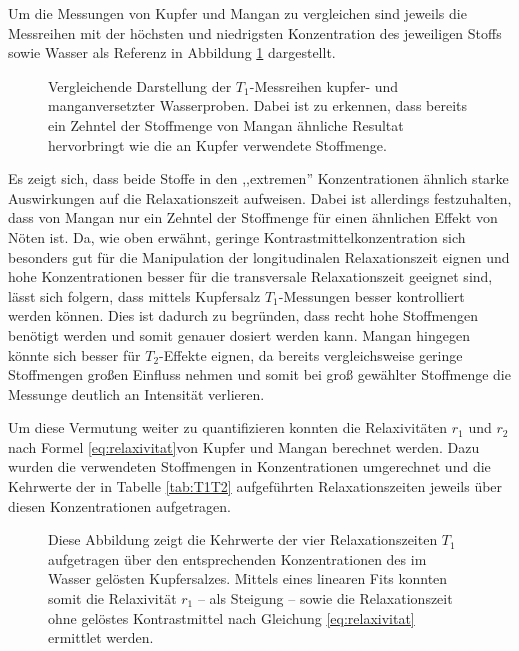 Um die Messungen von Kupfer und Mangan zu vergleichen sind jeweils die Messreihen mit der höchsten und niedrigsten Konzentration des jeweiligen Stoffs sowie Wasser als Referenz in Abbildung \ref{fig:T1CuMn} dargestellt. 

\begin{figure}[H]
    \centering
    
    \caption[Vergleichende Darstellung der $T_1$-Messreihen kupfer- und manganversetzter Wasserproben.]{Vergleichende Darstellung der $T_1$-Messreihen kupfer- und manganversetzter Wasserproben. Dabei ist zu erkennen, dass bereits ein Zehntel der Stoffmenge von Mangan ähnliche Resultat hervorbringt wie die an Kupfer verwendete Stoffmenge.}
    \label{fig:T1CuMn}
\end{figure}

Es zeigt sich, dass beide Stoffe in den ,,extremen'' Konzentrationen ähnlich starke Auswirkungen auf die Relaxationszeit aufweisen.
Dabei ist allerdings festzuhalten, dass von Mangan nur ein Zehntel der Stoffmenge für einen ähnlichen Effekt von Nöten ist.
Da, wie oben erwähnt, geringe Kontrastmittelkonzentration sich besonders gut für die Manipulation der longitudinalen Relaxationszeit eignen und hohe Konzentrationen besser für die transversale Relaxationszeit geeignet sind, lässt sich folgern, dass mittels Kupfersalz $T_1$-Messungen besser kontrolliert werden können.
Dies ist dadurch zu begründen, dass recht hohe Stoffmengen benötigt werden und somit genauer dosiert werden kann.
Mangan hingegen könnte sich besser für $T_2$-Effekte eignen, da bereits vergleichsweise geringe Stoffmengen großen Einfluss nehmen und somit bei groß gewählter Stoffmenge die Messunge deutlich an Intensität verlieren.

Um diese Vermutung weiter zu quantifizieren konnten die Relaxivitäten $r_1$ und $r_2$ nach Formel \eqref{eq:relaxivitat}von Kupfer und Mangan berechnet werden.
Dazu wurden die verwendeten Stoffmengen in Konzentrationen umgerechnet und die Kehrwerte der in Tabelle \ref{tab:T1T2} aufgeführten Relaxationszeiten jeweils über diesen Konzentrationen aufgetragen.

\begin{figure}[H]
    \centering
    
    \caption[Linearer Fit zur Ermittlung der Relaxivität $r_1$ von Kupfer.]{Diese Abbildung zeigt die Kehrwerte der vier Relaxationszeiten $T_1$ aufgetragen über den entsprechenden Konzentrationen des im Wasser gelösten Kupfersalzes. Mittels eines linearen Fits konnten somit die Relaxivität $r_1$ -- als Steigung -- sowie die Relaxationszeit ohne gelöstes Kontrastmittel nach Gleichung \eqref{eq:relaxivitat} ermittlet werden.}
    \label{fig:RelaxCUT1}
\end{figure}

